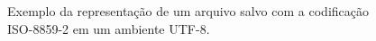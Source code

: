 \begin{figure}[H]
\caption{Exemplo da representação de um arquivo salvo com a codificação ISO-8859-2 em um ambiente UTF-8.}
\vspace{6mm}
    \begin{center}

\end{center}
\end{figure}
